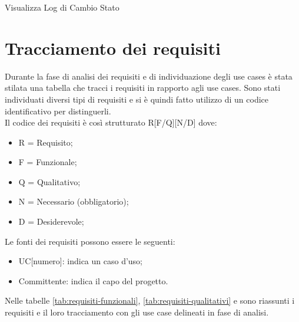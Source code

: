 \begin{usecase}{7.2}{Visualizza Log di Cambio Stato}
\label{uc:visualizzazione-log}
\end{usecase}

\newpage

\section{Tracciamento dei requisiti}

Durante la fase di analisi dei requisiti e di individuazione degli use cases è stata stilata una tabella che tracci i requisiti in rapporto agli use cases. Sono stati individuati diversi tipi di requisiti e si è quindi fatto utilizzo di un codice identificativo per distinguerli.\\
Il codice dei requisiti è così strutturato R[F/Q][N/D] dove:
\begin{itemize}
    \item[] R = Requisito;
    \item[] F = Funzionale;
    \item[] Q = Qualitativo;
    \item[] N = Necessario (obbligatorio);
    \item[] D = Desiderevole;
\end{itemize}

Le fonti dei requisiti possono essere le seguenti:
\begin{itemize}
    \item[] UC[numero]: indica un caso d'uso;
    \item[] Committente: indica il capo del progetto.
\end{itemize}

Nelle tabelle \ref{tab:requisiti-funzionali}, \ref{tab:requisiti-qualitativi} e sono riassunti i requisiti e il loro tracciamento con gli use case delineati in fase di analisi.


